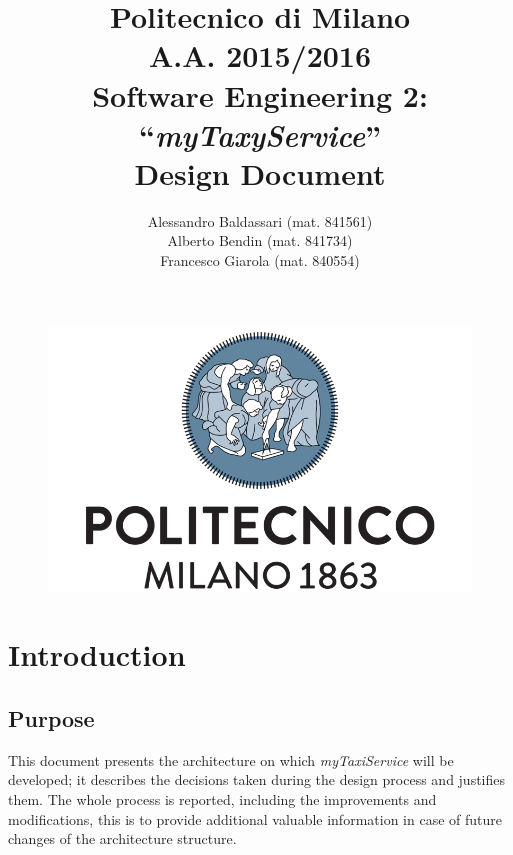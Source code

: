 \documentclass[a4paper,11pt]{report} %
\title{Politecnico di Milano\\A.A. 2015/2016\\Software Engineering 2: ``{\em myTaxyService}'' \\ \bigskip 
\textbf{D}esign \textbf{D}ocument}
\author{Alessandro Baldassari (mat. 841561) \\ Alberto Bendin (mat. 841734) \\ Francesco Giarola (mat. 840554)}
\newcommand{\mts}{\mbox{\normalfont\itshape myTaxiService}}
\begin{document}
	
	
	\begin{figure}[t]
		\centering
		\includegraphics[width=1\linewidth]{"Pictures/polimi-logo"}
		\label{fig:polimi-logo}
	\end{figure}
	
	\maketitle
		
	
	\thispagestyle{empty}
	\clearpage\mbox{}\clearpage

	
	
	
	\renewcommand*\thesection{\arabic{section}}
	\renewcommand*\thesubsection{\arabic{section}.\arabic{subsection}}
	\renewcommand*\thesubsubsection{%
	\arabic{section}.\arabic{subsection}.\arabic{subsubsection}%
	}
	\setcounter{secnumdepth}{4}
	\setcounter{tocdepth}{4}
		
	
	\tableofcontents
	\newpage
	
	
	
	\section{Introduction}
	
	\subsection{Purpose} This document presents the architecture on which \mts{} will be developed; it describes the decisions taken during the design process and justifies them. The whole process is reported, including the improvements and modifications, this is to provide additional valuable information in case of future changes of the architecture structure.
	
\end{document}
